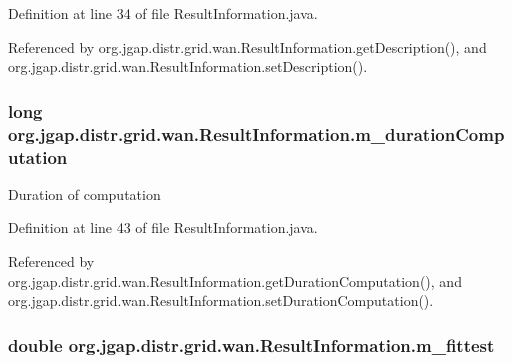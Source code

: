 Definition at line 34 of file Result\-Information.\-java.



Referenced by org.\-jgap.\-distr.\-grid.\-wan.\-Result\-Information.\-get\-Description(), and org.\-jgap.\-distr.\-grid.\-wan.\-Result\-Information.\-set\-Description().

\hypertarget{classorg_1_1jgap_1_1distr_1_1grid_1_1wan_1_1_result_information_a4fcbf55ae05f8b8ca4aebcea9736002b}{
\subsubsection[{m\-\_\-duration\-Computation}]{\setlength{\rightskip}{0pt plus 5cm}long org.\-jgap.\-distr.\-grid.\-wan.\-Result\-Information.\-m\-\_\-duration\-Computation\hspace{0.3cm}{\ttfamily [private]}}}\label{classorg_1_1jgap_1_1distr_1_1grid_1_1wan_1_1_result_information_a4fcbf55ae05f8b8ca4aebcea9736002b}
Duration of computation 

Definition at line 43 of file Result\-Information.\-java.



Referenced by org.\-jgap.\-distr.\-grid.\-wan.\-Result\-Information.\-get\-Duration\-Computation(), and org.\-jgap.\-distr.\-grid.\-wan.\-Result\-Information.\-set\-Duration\-Computation().

\hypertarget{classorg_1_1jgap_1_1distr_1_1grid_1_1wan_1_1_result_information_a8361530958669f508d2c782eb2f189a3}{
\subsubsection[{m\-\_\-fittest}]{\setlength{\rightskip}{0pt plus 5cm}double org.\-jgap.\-distr.\-grid.\-wan.\-Result\-Information.\-m\-\_\-fittest}}\label{classorg_1_1jgap_1_1distr_1_1grid_1_1wan_1_1_result_information_a8361530958669f508d2c782eb2f189a3}


